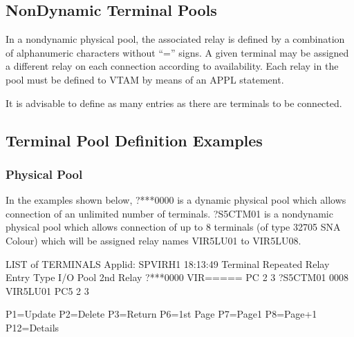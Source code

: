 \documentclass[letterpaper,10pt,english]{sphinxmanual}
\begin{document}
\subsection{Non\sphinxhyphen{}Dynamic Terminal Pools}
\label{\detokenize{connectivity_guide:non-dynamic-terminal-pools}}\label{\detokenize{connectivity_guide:index-144}}
\sphinxAtStartPar
In a non\sphinxhyphen{}dynamic physical pool, the associated relay is defined by a combination of alphanumeric characters without “=” signs. A given terminal may be assigned a different relay on each connection according to availability. Each relay in the pool must be defined to VTAM by means of an APPL statement.

\sphinxAtStartPar
It is advisable to define as many entries as there are terminals to be connected.

\ignorespaces 

\subsection{Terminal Pool Definition Examples}
\label{\detokenize{connectivity_guide:terminal-pool-definition-examples}}\label{\detokenize{connectivity_guide:index-145}}

\subsubsection{Physical Pool}
\label{\detokenize{connectivity_guide:physical-pool}}
\sphinxAtStartPar
In the examples shown below, ?***0000 is a dynamic physical pool which allows connection of an unlimited number of terminals. ?S5CTM01 is a non\sphinxhyphen{}dynamic physical pool which allows connection of up to 8 terminals (of type 3270\sphinxhyphen{}5 SNA Colour) which will be assigned relay names VIR5LU01 to VIR5LU08.

\begin{sphinxVerbatim}[commandchars=\\\{\}]
LIST of TERMINALS \PYGZhy{}\PYGZhy{}\PYGZhy{}\PYGZhy{}\PYGZhy{}\PYGZhy{}\PYGZhy{}\PYGZhy{}\PYGZhy{}\PYGZhy{}\PYGZhy{}\PYGZhy{}\PYGZhy{}\PYGZhy{}\PYGZhy{}\PYGZhy{}\PYGZhy{}\PYGZhy{}\PYGZhy{}\PYGZhy{}\PYGZhy{}\PYGZhy{}\PYGZhy{}\PYGZhy{}\PYGZhy{}\PYGZhy{}\PYGZhy{}\PYGZhy{}\PYGZhy{}\PYGZhy{}\PYGZhy{}\PYGZhy{}\PYGZhy{}\PYGZhy{} Applid: SPVIRH1 18:13:49
Terminal Repeated   Relay    Entry   Type I/O Pool 2nd Relay
?***0000            VIR===== PC      2    3
?S5CTM01 0008       VIR5LU01 PC5     2    3


P1=Update           P2=Delete        P3=Return         P6=1st Page
P7=Page\PYGZhy{}1           P8=Page+1        P12=Details
\end{sphinxVerbatim}
\end{document}
